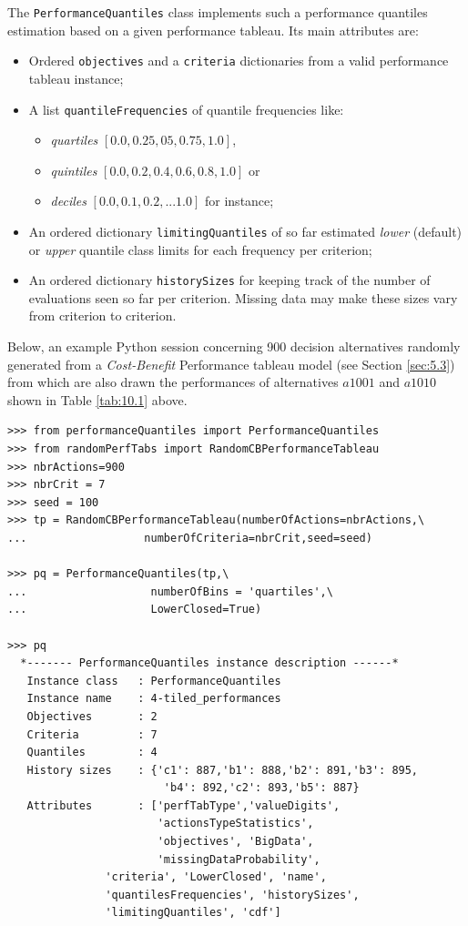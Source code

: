 The \texttt{PerformanceQuantiles} class implements such a performance quantiles estimation based on a given performance tableau. Its main attributes are:
\begin{itemize}
\item Ordered \texttt{objectives} and a \texttt{criteria} dictionaries from a valid performance tableau instance;
\item A list \texttt{quantileFrequencies} of quantile frequencies like:
  \begin{itemize}
  \item \emph{quartiles} $[0.0, 0.25, 05, 0.75,1.0]$,
  \item  \emph{quintiles} $[0.0, 0.2, 0.4, 0.6, 0.8, 1.0]$ or
  \item  \emph{deciles} $[0.0, 0.1, 0.2, ... 1.0]$ for instance;
  \end{itemize}
\item An ordered  dictionary \texttt{limitingQuantiles} of so far estimated \emph{lower} (default) or \emph{upper} quantile class limits for each frequency per criterion;
\item An ordered dictionary \texttt{historySizes} for keeping track of the number of evaluations seen so far per criterion. Missing data may make these sizes vary from criterion to criterion.
\end{itemize}

Below, an example Python session concerning 900 decision alternatives randomly generated from a \emph{Cost-Benefit} Performance tableau model (see Section \ref{sec:5.3}) from which are also drawn the performances of alternatives $a1001$ and $a1010$ shown in Table \ref{tab:10.1} above.

\begin{lstlisting}[caption={Computing performance quantiles from a given performance tableau},label=list:10.1]
>>> from performanceQuantiles import PerformanceQuantiles
>>> from randomPerfTabs import RandomCBPerformanceTableau
>>> nbrActions=900
>>> nbrCrit = 7
>>> seed = 100
>>> tp = RandomCBPerformanceTableau(numberOfActions=nbrActions,\
...                  numberOfCriteria=nbrCrit,seed=seed)

>>> pq = PerformanceQuantiles(tp,\
...                   numberOfBins = 'quartiles',\
...                   LowerClosed=True)

>>> pq
  *------- PerformanceQuantiles instance description ------*
   Instance class   : PerformanceQuantiles
   Instance name    : 4-tiled_performances
   Objectives       : 2
   Criteria         : 7
   Quantiles        : 4
   History sizes    : {'c1': 887,'b1': 888,'b2': 891,'b3': 895,
                        'b4': 892,'c2': 893,'b5': 887}
   Attributes       : ['perfTabType','valueDigits',
                       'actionsTypeStatistics',
                       'objectives', 'BigData',
                       'missingDataProbability',
		       'criteria', 'LowerClosed', 'name',
		       'quantilesFrequencies', 'historySizes',
		       'limitingQuantiles', 'cdf']
\end{lstlisting}


